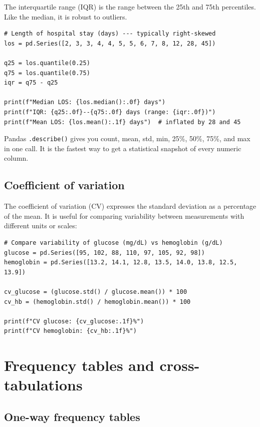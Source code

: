 The interquartile range (IQR) is the range between the 25th and 75th percentiles. Like the median, it is robust to outliers.

\begin{verbatim}
# Length of hospital stay (days) --- typically right-skewed
los = pd.Series([2, 3, 3, 4, 4, 5, 5, 6, 7, 8, 12, 28, 45])

q25 = los.quantile(0.25)
q75 = los.quantile(0.75)
iqr = q75 - q25

print(f"Median LOS: {los.median():.0f} days")
print(f"IQR: {q25:.0f}--{q75:.0f} days (range: {iqr:.0f})")
print(f"Mean LOS: {los.mean():.1f} days")  # inflated by 28 and 45
\end{verbatim}

\begin{pythontip}
Pandas \texttt{.describe()} gives you count, mean, std, min, 25\%, 50\%, 75\%, and max in one call. It is the fastest way to get a statistical snapshot of every numeric column.
\end{pythontip}

\subsection{Coefficient of variation}

The coefficient of variation (CV) expresses the standard deviation as a percentage of the mean. It is useful for comparing variability between measurements with different units or scales:

\begin{verbatim}
# Compare variability of glucose (mg/dL) vs hemoglobin (g/dL)
glucose = pd.Series([95, 102, 88, 110, 97, 105, 92, 98])
hemoglobin = pd.Series([13.2, 14.1, 12.8, 13.5, 14.0, 13.8, 12.5, 13.9])

cv_glucose = (glucose.std() / glucose.mean()) * 100
cv_hb = (hemoglobin.std() / hemoglobin.mean()) * 100

print(f"CV glucose: {cv_glucose:.1f}%")
print(f"CV hemoglobin: {cv_hb:.1f}%")
\end{verbatim}

\section{Frequency tables and cross-tabulations}

\subsection{One-way frequency tables}

